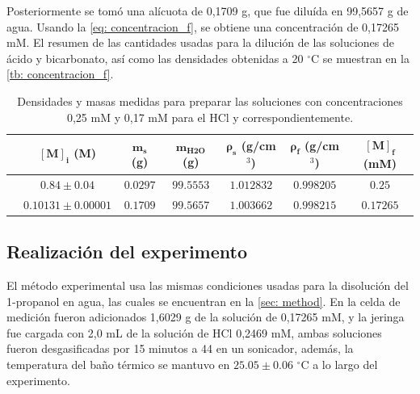 	Posteriormente se tom\'o una al\'icuota de 0,1709 g, que fue dilu\'ida en 99,5657 g de agua. Usando la \autoref{eq: concentracion_f}, se obtiene una concentraci\'on de 0,17265 mM. El resumen de las cantidades usadas para la diluci\'on de las soluciones de \'acido y bicarbonato, as\'i como las densidades obtenidas a 20 $^\circ$C se muestran en la \autoref{tb: concentracion_f}.
	\begin{table}[h]
		\centering
		\caption{Densidades y masas medidas para preparar las soluciones con concentraciones 0,25 mM y 0,17 mM para el HCl y  correspondientemente.}
		\small
		\begin{tabular}{c|cccccc}
			\hline
			& $\mathbf{[M]_i}$ (M) & $\mathbf{m_s}$ (g) & $\mathbf{m_{\text{H2O}}}$ (g) & $\bm{\rho_s}$ (g/cm$^3$)& $\bm{\rho_f}$ (g/cm$^3$) & $\mathbf{[M]_f}$ (mM) \\
			\hline
			\textbf{\ce{HCl}} & $0.84 \pm 0.04$ & $0.0297$ & $99.5553$ & $1.012832$ & $0.998205$ & $0.25$ \\
			\textbf{\ce{KHCO3}} & $0.10131\pm 0.00001$ & $0.1709$ & $99.5657$ & $1.003662$ & $0.998215$ & $0.17265$ \\
			\hline
		\end{tabular}
		\label{tb: concentracion_f}
	\end{table}
	
	
\subsection{Realizaci\'on del experimento}
	El m\'etodo experimental usa las mismas condiciones usadas para la disoluci\'on del 1-propanol en agua, las cuales se encuentran en la \autoref{sec: method}. En la celda de medición fueron adicionados 1,6029 g de la solución de  0,17265 mM, y la jeringa fue cargada con 2,0 mL de la soluci\'on de HCl 0,2469 mM, ambas soluciones fueron desgasificadas por 15 minutos a 44 \grad{} en un sonicador, adem\'as, la temperatura del ba\~no t\'ermico se mantuvo en $25.05 \pm 0.06$ $^\circ$C a lo largo del experimento.
	
